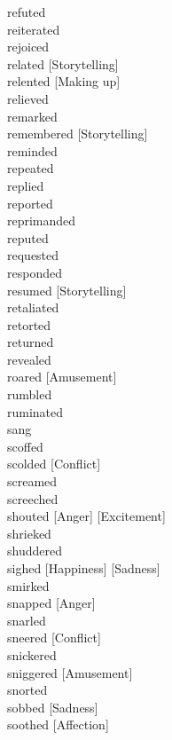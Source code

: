 \documentclass[a4paper,12pt,fleqn]{book}\usepackage{polyglossia}\setdefaultlanguage[babelshorthands=true]{russian}\setotherlanguage{english}\defaultfontfeatures{Ligatures=TeX,Mapping=tex-text}\usepackage{xcolor}\newcommand{\ml}[3]{#2}
\begin{document}
{refuted \hfill \\
reiterated \hfill \\
rejoiced \hfill \\
related [Storytelling] \hfill \\
relented [Making up] \hfill \\
relieved \hfill \\
remarked \hfill \\
remembered [Storytelling] \hfill \\
reminded \hfill \\
repeated \hfill \\
replied \hfill \\
reported \hfill \\
reprimanded \hfill \\
reputed \hfill \\
requested \hfill \\
responded \hfill \\
resumed [Storytelling] \hfill \\
retaliated \hfill \\
retorted \hfill \\
returned \hfill \\
revealed \hfill \\
roared [Amusement] \hfill \\
rumbled \hfill \\
ruminated \hfill \\
sang \hfill \\
scoffed \hfill \\
scolded [Conflict] \hfill \\
screamed \hfill \\
screeched \hfill \\
shouted [Anger] [Excitement] \hfill \\
shrieked \hfill \\
shuddered \hfill \\
sighed [Happiness] [Sadness] \hfill \\
smirked \hfill \\
snapped [Anger] \hfill \\
snarled \hfill \\
sneered [Conflict] \hfill \\
snickered \hfill \\
sniggered [Amusement] \hfill \\
snorted \hfill \\
sobbed [Sadness] \hfill \\
soothed [Affection] \hfill \\
}
\end{document}
